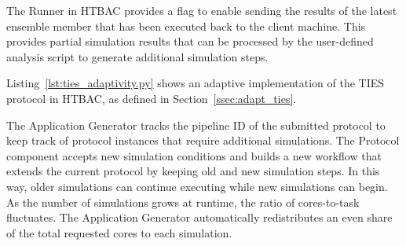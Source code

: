 
The Runner in HTBAC provides a flag to enable sending the results of the
latest ensemble member that has been executed back to the client machine.
This provides partial simulation results that can be processed by the
user-defined analysis script to generate additional simulation steps.




Listing~\ref{lst:ties_adaptivity.py} shows an adaptive implementation of the
TIES protocol in HTBAC, as defined in Section~\ref{ssec:adapt_ties}.



The Application Generator tracks the pipeline ID of the submitted protocol to
keep track of protocol instances that require additional simulations. The
Protocol component accepts new simulation conditions and builds a new
workflow that extends the current protocol by keeping old and new simulation
steps. In this way, older simulations can continue executing while new
simulations can begin. As the number of simulations grows at runtime, the
ratio of cores-to-task fluctuates. The Application Generator automatically
redistributes an even share of the total requested cores to each simulation.

